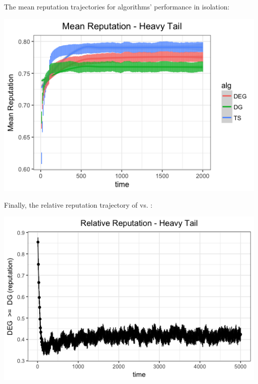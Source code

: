 \documentclass[../competing_bandits_with_appendix.tex]{subfiles}
\begin{document}
\begin{appendices}
The mean reputation trajectories for algorithms' performance in isolation:
\begin{center}
\includegraphics[scale=0.35]{appendix_figures/mean_ht_3_arms} \\
\end{center}

Finally, the relative reputation trajectory of \DEG vs. \DG:
\begin{center}
\includegraphics[scale=0.35]{appendix_figures/rel_rep_ht_3_arms}
\end{center}
\end{appendices}
\end{document}
